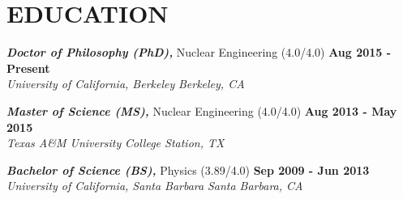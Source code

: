 \section{\small{EDUCATION}}

{\sl\bf Doctor of Philosophy (PhD),} Nuclear Engineering (4.0/4.0) \hfill {\bf Aug 2015 - Present} \\
{\sl University of California, Berkeley} \hfill {\sl Berkeley, CA}\\[-2.8ex]
\vspace{-5pt}

{\sl\bf Master of Science (MS),} Nuclear Engineering (4.0/4.0) \hfill {\bf Aug 2013 - May 2015} \\
{\sl Texas A\&M University} \hfill {\sl College Station, TX}\\[-2.8ex]
\vspace{-5pt}

{\sl\bf Bachelor of Science (BS),} Physics (3.89/4.0) \hfill {\bf Sep 2009 - Jun 2013} \\
{\sl University of California, Santa Barbara} \hfill {\sl Santa Barbara, CA}\\[-2.8ex]
